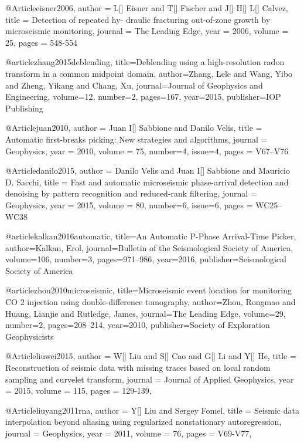     @Article{eisner2006,
  author = 	 {L[] Eisner and T[] Fischer and J[] H[] L[] Calvez},
  title = 	 {Detection of repeated hy- draulic fracturing  out-of-zone growth  by microseismic monitoring},
  journal = 	 {The Leading Edge},
  year = 	 2006,
  volume = 	 25,
  pages = 	 {548-554}}
  
  @article{zhang2015deblending,
  title={Deblending using a high-resolution radon transform in a common midpoint domain},
  author={Zhang, Lele and Wang, Yibo and Zheng, Yikang and Chang, Xu},
  journal={Journal of Geophysics and Engineering},
  volume={12},
  number={2},
  pages={167},
  year={2015},
  publisher={IOP Publishing}
}

    @Article{juan2010,
  author = 	 {Juan I[] Sabbione and Danilo Velis},
  title = 	 {Automatic first-breaks picking: New strategies and algorithms},
  journal = 	 {Geophysics},
  year = 	 2010,
  volume = 	 75,
  number=4,
  issue=4,
  pages = 	 {V67–V76}} 
  
      @Article{danilo2015,
  author = 	 {Danilo Velis and Juan I[] Sabbione and Mauricio D. Sacchi},
  title = 	 {Fast and automatic microseismic phase-arrival detection and denoising by pattern recognition and reduced-rank filtering},
  journal = 	 {Geophysics},
  year = 	 2015,
  volume = 	 80,
  number=6,
  issue=6,
  pages = 	 {WC25–WC38}} 
  
@article{kalkan2016automatic,
  title={An Automatic P-Phase Arrival-Time Picker},
  author={Kalkan, Erol},
  journal={Bulletin of the Seismological Society of America},
  volume={106},
  number={3},
  pages={971--986},
  year={2016},
  publisher={Seismological Society of America}
}

@article{zhou2010microseismic,
  title={Microseismic event location for monitoring CO 2 injection using double-difference tomography},
  author={Zhou, Rongmao and Huang, Lianjie and Rutledge, James},
  journal={The Leading Edge},
  volume={29},
  number={2},
  pages={208--214},
  year={2010},
  publisher={Society of Exploration Geophysicists}
}
  
@Article{liuwei2015,
  author = 	 {W[] Liu and S[] Cao and G[] Li and Y[] He},
  title = 	 {Reconstruction of seismic data with missing traces based on local random sampling and curvelet transform},
  journal = 	 {Journal of Applied Geophysics},
  year = 	 2015,
  volume = 115,
  pages =	 {129-139},
}

@Article{liuyang2011rna,
  author = 	 {Y[] Liu and Sergey Fomel},
  title = 	 {Seismic data interpolation beyond aliasing using regularized nonstationary autoregression},
  journal = 	 {Geophysics},
  year = 	 2011,
  volume =	 76,
  pages =	 {V69-V77},
}

